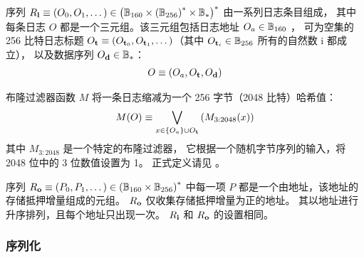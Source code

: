 序列 $R_{\bf l}\equiv \left(O_0,O_1,\dots\right) \in \left(\mathbb{B}_{160} \times \left(\mathbb{B}_{256}\right)^*\times \mathbb{B}_*\right)^*$ 由一系列日志条目组成，
其中每条日志 $O$ 都是一个三元组。该三元组包括日志地址 $O_a\in \mathbb{B}_{160}$ ，
可为空集的 256 比特日志标题 $O_{\bf t}\equiv \left(O_{{\bf t}_0}, O_{{\bf t}_1},\dots \right)$（其中 $O_{{\bf t}_i}\in\mathbb{B}_{256}$ 所有的自然数 i 都成立），
以及数据序列 $O_{\bf d}\in\mathbb{B}_*$：
\begin{align}
	O\equiv \left( O_a, O_{\bf t}, O_{\bf d} \right)
\end{align}

布隆过滤器函数 $M$ 将一条日志缩减为一个 256 字节（2048 比特）哈希值：
\begin{align}
 	M(O)\equiv \bigvee_{x\in{\left \{{O_a} \right \}}\cup O_{\bf t}}\left( M_{3:2048}(x) \right)
\end{align} 
其中 $M_{3:2048}$ 是一个特定的布隆过滤器，
它根据一个随机字节序列的输入，将 2048 位中的 3 位数值设置为 1。
正式定义请见 \cite{ETH_yellow}。

序列 $R_{\bf o}\equiv \left(P_0,P_1,\dots\right) \in \left(\mathbb{B}_{160} \times \mathbb{B}_{256}\right)^*$ 中每一项 $P$ 都是一个由地址，该地址的存储抵押增量组成的元组。
$R_{\bf o}$ 仅收集存储抵押增量为正的地址。
其以地址进行升序排列，且每个地址只出现一次。
$R_{\bf i}$ 和 $R_{\bf o}$ 的设置相同。

\subsubsection{序列化}

